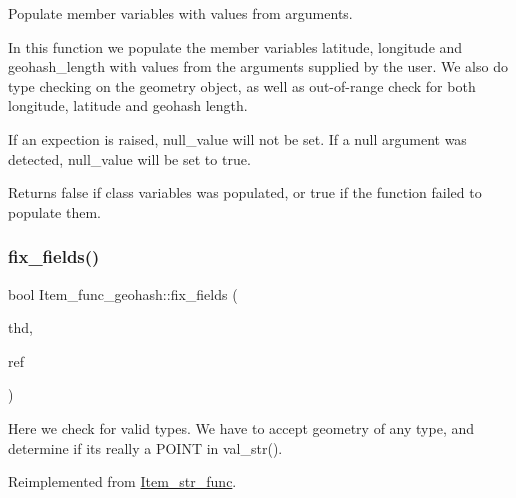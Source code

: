 Populate member variables with values from arguments.

In this function we populate the member variables \textquotesingle{}latitude\textquotesingle{}, \textquotesingle{}longitude\textquotesingle{} and \textquotesingle{}geohash\+\_\+length\textquotesingle{} with values from the arguments supplied by the user. We also do type checking on the geometry object, as well as out-\/of-\/range check for both longitude, latitude and geohash length.

If an expection is raised, null\+\_\+value will not be set. If a null argument was detected, null\+\_\+value will be set to true.

\begin{DoxyReturn}{Returns}
false if class variables was populated, or true if the function failed to populate them. 
\end{DoxyReturn}
\mbox{\label{classItem__func__geohash_a55985b35b8f0607b19b7490e99704461}} 
\subsubsection{\texorpdfstring{fix\+\_\+fields()}{fix\_fields()}}
{\footnotesize\ttfamily bool Item\+\_\+func\+\_\+geohash\+::fix\+\_\+fields (\begin{DoxyParamCaption}\item[{T\+HD $\ast$}]{thd,  }\item[{\mbox{\hyperlink{classItem}{Item}} $\ast$$\ast$}]{ref }\end{DoxyParamCaption})\hspace{0.3cm}{\ttfamily [virtual]}}

Here we check for valid types. We have to accept geometry of any type, and determine if it\textquotesingle{}s really a P\+O\+I\+NT in val\+\_\+str(). 

Reimplemented from \mbox{\hyperlink{classItem__str__func}{Item\+\_\+str\+\_\+func}}.

\mbox{\label{classItem__func__geohash_af84e272abb84634d9ad7375602ce462f}} 
